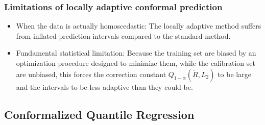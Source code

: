 \documentclass[11pt,a4paper]{article}
\begin{document}
\subsubsection{Limitations of locally adaptive conformal prediction}
\begin{itemize}
    \item When the data is actually homoscedastic: The locally adaptive method suffers from inflated prediction intervals compared to the standard method.
    \item Fundamental statistical limitation: Because the training set are biased by an optimization procedure designed to minimize them, while the calibration set are unbiased, this forces the correction constant $Q_{1-\alpha}(\tilde{R}, L_2)$ to be large and the intervals to be less adaptive than they could be.
\end{itemize}

\subsection{Conformalized Quantile Regression}
\end{document}
